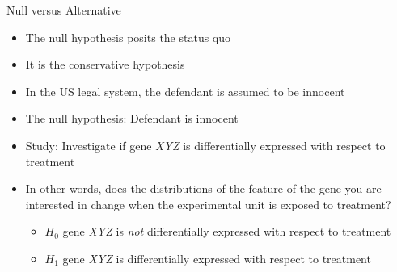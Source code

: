 \documentclass[xcolor=x11names,compress]{beamer}\usepackage[]{graphicx}\usepackage[]{color}
\begin{document}

\begin{frame}{Null versus Alternative}
  \begin{itemize}
  \item The null hypothesis posits the status quo
  \item It is the conservative hypothesis 
  \item In the US legal system, the defendant is assumed to be innocent
  \item The null hypothesis: Defendant is innocent
  \item Study: Investigate if gene {\it XYZ} is differentially expressed with respect to treatment
  \item In other words, does the distributions of the feature of the gene
      you are interested in change when the experimental unit is exposed to 
      treatment?
    \begin{itemize}
    \item $H_0$ gene {\it XYZ} is {\it not} differentially expressed with respect to treatment
    \item $H_1$ gene {\it XYZ} is differentially expressed with respect to treatment
    \end{itemize}
  \end{itemize}
  
\end{frame}
\end{document}
